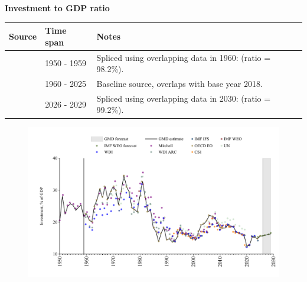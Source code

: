 \documentclass[12pt,a4paper,landscape]{article}
\begin{document}
\begin{adjustbox}{max totalsize={\paperwidth}{\paperheight},center}
\begin{minipage}[t][\textheight][t]{\textwidth}
\vspace*{0.5cm}
{}
\begin{center}
{\Large\bfseries Investment to GDP ratio}
\end{center}
\vspace{0.5cm}
\begin{table}[H]
\centering
\small
\begin{tabular}{|l|l|l|}
\hline
\textbf{Source} & \textbf{Time span} & \textbf{Notes} \\
\hline
\rowcolor{white}\cite{Mitchell}& 1950 - 1959 &Spliced using overlapping data in 1960: (ratio = 98.2\%). \\
\rowcolor{lightgray}\cite{OECD_EO}& 1960 - 2025 &Baseline source, overlaps with base year 2018. \\
\rowcolor{white}\cite{IMF_WEO_forecast}& 2026 - 2029 &Spliced using overlapping data in 2030: (ratio = 99.2\%). \\
\hline
\end{tabular}
\end{table}
\begin{figure}[H]
\centering
\includegraphics[width=\textwidth,height=0.6\textheight,keepaspectratio]{graphs/ZAF_inv_GDP.pdf}
\end{figure}
\end{minipage}
\end{adjustbox}
\end{document}
